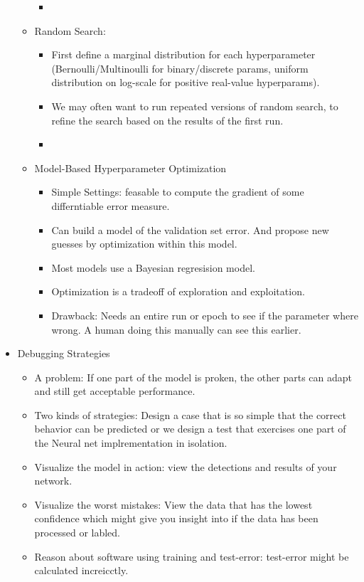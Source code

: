 \begin{itemize}[noitemsep,nolistsep]
\begin{itemize}[noitemsep,nolistsep]
\begin{itemize}[noitemsep,nolistsep]
			\item 
		\end{itemize}
		\item Random Search:
		\begin{itemize}[noitemsep,nolistsep]
			\item First define a marginal distribution for each hyperparameter (Bernoulli/Multinoulli for binary/discrete params, uniform distribution on log-scale for positive real-value hyperparams).
			\item We may often want to run repeated versions of random search, to refine the search based on the results of the first run.
			\item 
		\end{itemize}
		\item Model-Based Hyperparameter Optimization
		\begin{itemize}[noitemsep,nolistsep]
			\item Simple Settings: feasable to compute the gradient of some differntiable error measure.
			\item Can build a model of the validation set error. And propose new guesses by optimization within this model.
			\item Most models use a Bayesian regresision model.
			\item Optimization is a tradeoff of exploration and exploitation.
			\item Drawback: Needs an entire run or epoch to see if the parameter where wrong. A human doing this manually can see this earlier.
		\end{itemize}
	\end{itemize}
	\item Debugging Strategies
	\begin{itemize}[noitemsep,nolistsep]
		\item A problem: If one part of the model is proken, the other parts can adapt and still get acceptable performance.
		\item Two kinds of strategies: Design a case that is so simple that the correct behavior can be predicted or we design a test that exercises one part of the Neural net implrementation in isolation.
		\item Visualize the model in action: view the detections and results of your network.
		\item Visualize the worst mistakes: View the data that has the lowest confidence which might give you insight into if the data has been processed or labled.
		\item Reason about software using training and test-error: test-error might be calculated increicctly.

\end{itemize}
\end{itemize}
